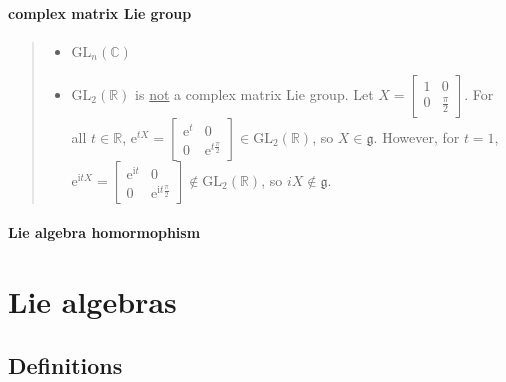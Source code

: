 \documentclass[letterpaper, 10pt]{article}
\theoremstyle{theostyle}
\begin{document}
\paragraph{complex matrix Lie group}
\begin{quote}
\begin{itemize}
    \item \(\mathrm{GL}_n(\mathbb{C})\)
    \item \(\mathrm{GL}_2(\mathbb{R})\) is \underline{not} a complex matrix Lie group.
    Let \(X = \begin{bmatrix}
        1 & 0 \\
        0 & \frac{\pi}{2}
    \end{bmatrix}\).
    For all \(t \in \mathbb{R}\),
    \(\mathrm{e}^{tX} = \begin{bmatrix}
        \mathrm{e}^t & 0 \\
        0 & \mathrm{e}^{t\frac{\pi}{2}}
    \end{bmatrix} \in \mathrm{GL}_2(\mathbb{R})\), so \(X \in \mathfrak{g}\).
    However, for \(t = 1\), \(\mathrm{e}^{\mathrm{i}tX} = \begin{bmatrix}
        \mathrm{e}^{\mathrm{i}t} & 0 \\
        0 & \mathrm{e}^{\mathrm{i}t\frac{\pi}{2}}
    \end{bmatrix} \notin \mathrm{GL}_2(\mathbb{R})\), so \(iX \notin \mathfrak{g}\).
\end{itemize}
\end{quote}

\paragraph{Lie algebra homormophism}
\begin{quote}

\end{quote}


\section{Lie algebras}

\subsection{Definitions}
\end{document}

